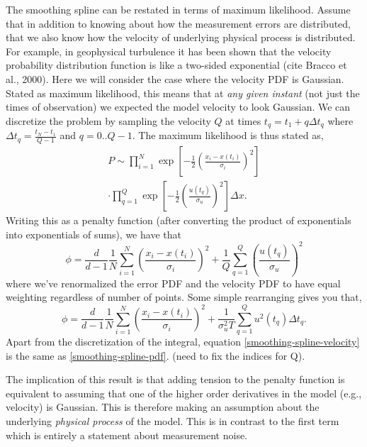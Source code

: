 \documentclass[twocol]{ametsoc}
\begin{document}
The smoothing spline can be restated in terms of maximum likelihood. Assume that in addition to knowing about how the measurement errors are distributed, that we also know how the velocity of underlying physical process is distributed. For example, in geophysical turbulence it has been shown that the velocity probability distribution function is like a two-sided exponential (cite Bracco et al., 2000). Here we will consider the case where the velocity PDF is Gaussian. Stated as maximum likelihood, this means that at \emph{any given instant} (not just the times of observation) we expected the model velocity to look Gaussian. We can discretize the problem by sampling the velocity $Q$ at times $t_q = t_1 + q \Delta t_q$ where $\Delta t_q=\frac{t_N-t_1}{Q-1}$ and $q=0..Q-1$. The maximum likelihood is thus stated as,
\begin{equation}
\label{gaussian-max-likelihood}
\begin{split}
P \sim \prod^N _{i=1}\exp \left[ -\frac{1}{2} \left( \frac{x_i - x(t_i)}{\sigma_i} \right)^2 \right] \\\cdot \prod^{Q}_{q=1} \exp \left[  - \frac{1}{2} \left(  \frac{u(t_q)}{\sigma_u} \right)^2 \right] \Delta x.
\end{split}
\end{equation}
Writing this as a penalty function (after converting the product of exponentials into exponentials of sums), we have that
\begin{equation}
\phi =  \frac{d}{d-1} \frac{1}{N} \sum^N _{i=1}\left( \frac{x_i - x(t_i)}{\sigma_i} \right)^2 + \frac{1}{Q} \sum^{Q}_{q=1}  \left(  \frac{u(t_q)}{\sigma_u} \right)^2
\end{equation}
where we've renormalized the error PDF and the velocity PDF to have equal weighting regardless of number of points. Some simple rearranging gives you that,
\begin{equation}
\label{smoothing-spline-pdf}
\phi =\frac{d}{d-1}  \frac{1}{N} \sum^N _{i=1}  \left( \frac{x_i - x(t_i)}{\sigma_i} \right)^2 + \frac{1}{\sigma_u^2 T} \sum^{Q}_{q=1}  u^2(t_q) \Delta t_q.
\end{equation}
Apart from the discretization of the integral, equation \ref{smoothing-spline-velocity} is the same as \ref{smoothing-spline-pdf}. (need to fix the indices for Q).

The implication of this result is that adding tension to the penalty function is equivalent to assuming that one of the higher order derivatives in the model (e.g., velocity) is Gaussian. This is therefore making an assumption about the underlying \emph{physical process} of the model. This is in contrast to the first term which is entirely a statement about measurement noise.
\end{document}
